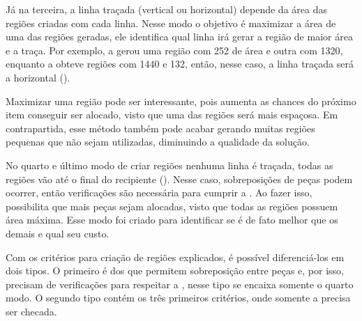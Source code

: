 Já na terceira, a linha traçada (vertical ou horizontal) depende da área das regiões criadas
com cada linha.
Nesse modo o objetivo é maximizar a área de uma das regiões geradas, ele identifica qual linha
irá gerar a região de maior área e a traça.
Por exemplo, a  gerou uma região com 252 de área e outra com 1320,
enquanto a  obteve regiões com 1440 e 132, então, nesse caso, a linha
traçada será a horizontal ().



Maximizar uma região pode ser interessante, pois aumenta as chances do próximo item conseguir ser
alocado, visto que uma das regiões será mais espaçosa.
Em contrapartida, esse método também pode acabar gerando muitas regiões pequenas que não sejam
utilizadas, diminuindo a qualidade da solução.

No quarto e último modo de criar regiões nenhuma linha é traçada, todas as regiões vão até o final
do recipiente ().
Nesse caso, sobreposições de peças podem ocorrer, então verificações são necessária para cumprir
a .
Ao fazer isso, possibilita que mais peças sejam alocadas, visto que todas as regiões possuem área
máxima.
Esse modo foi criado para identificar se é de fato melhor que os demais e qual seu custo.



Com os critérios para criação de regiões explicados, é possível diferenciá-los em dois tipos.
O primeiro é dos que permitem sobreposição entre peças e, por isso, precisam de verificações para
respeitar a , nesse tipo se encaixa somente o quarto modo.
O segundo tipo contém os três primeiros critérios, onde somente a  precisa ser checada.